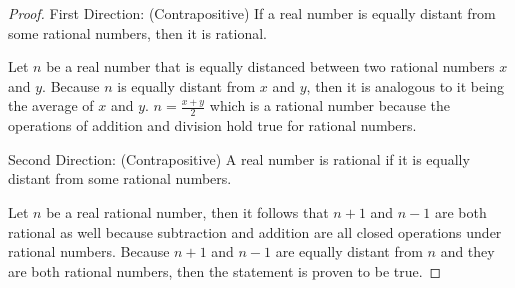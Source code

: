 \documentclass[11pt]{article}
\begin{document}
\begin{proof}
	First Direction: (Contrapositive) If a real number is equally distant from some rational numbers, then it is rational.

	Let $n$ be a real number that is equally distanced between two rational numbers $x$ and $y$. Because $n$ is equally distant from $x$ and $y$, then it is analogous to it being the average of $x$ and $y$. $n = \frac{x+y}{2}$ which is a rational number because the operations of addition and division hold true for rational numbers.

	Second Direction: (Contrapositive) A real number is rational if it is equally distant from some rational numbers.

	Let $n$ be a real rational number, then it follows that $n+1$ and $n-1$ are both rational as well because subtraction and addition are all closed operations under rational numbers. Because $n+1$ and $n-1$ are equally distant from $n$ and they are both rational numbers, then the statement is proven to be true.
\end{proof}







	
\end{document}
